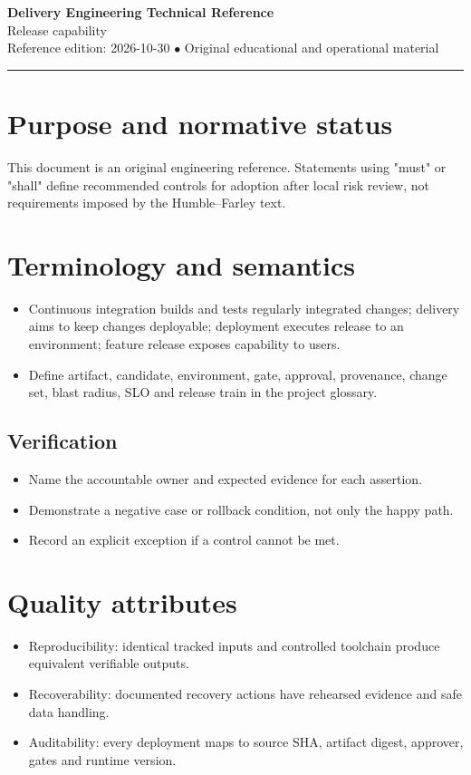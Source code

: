 \documentclass[10pt,letterpaper]{article}
\begin{document}
\begin{center}
{\LARGE\bfseries\color{cdblue}Delivery Engineering Technical Reference}\\[7pt]
{\large Release capability}\\[6pt]
{\small Reference edition: 2026-10-30 $\bullet$ Original educational and operational material}
\end{center}
\noindent\color{cdblue}\rule{\linewidth}{1.2pt}\color{black}
\vspace{0.4em}
\section{Purpose and normative status}
This document is an original engineering reference. Statements using "must" or "shall" define recommended controls for adoption after local risk review, not requirements imposed by the Humble--Farley text.


\section{Terminology and semantics}
\begin{itemize}
\item Continuous integration builds and tests regularly integrated changes; delivery aims to keep changes deployable; deployment executes release to an environment; feature release exposes capability to users.
\item Define artifact, candidate, environment, gate, approval, provenance, change set, blast radius, SLO and release train in the project glossary.
\end{itemize}
\subsection{Verification}
\begin{itemize}
\item Name the accountable owner and expected evidence for each assertion.
\item Demonstrate a negative case or rollback condition, not only the happy path.
\item Record an explicit exception if a control cannot be met.
\end{itemize}


\section{Quality attributes}
\begin{itemize}
\item Reproducibility: identical tracked inputs and controlled toolchain produce equivalent verifiable outputs.
\item Recoverability: documented recovery actions have rehearsed evidence and safe data handling.
\item Auditability: every deployment maps to source SHA, artifact digest, approver, gates and runtime version.
\end{itemize}
\end{document}
